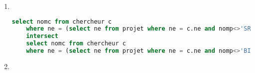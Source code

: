 \begin{enumerate}
{	L'utilisation des opérateurs ensembliste est indispensable, chercher ensuite une requete non ensembliste}
	\begin{lstlisting}[language=SQL, numbers=none]
select nomc from chercheur where nc in (
	select ne from aff 
	where np in(select np from projet where nomp = 'SRI')
)
intersect
select nomc from chercheur where nc in (
	select ne from aff 
	where np in(select np from projet where nomp = 'BIG')
)
	\end{lstlisting}
\item ~ 
\begin{lstlisting}[language=SQL, numbers=none]
	select nomc from chercheur c 
	where ne = (select ne from projet where ne = c.ne and nomp<>'SRI')
	intersect
	select nomc from chercheur c 
	where ne = (select ne from projet where ne = c.ne and nomp<>'BIG')
\end{lstlisting}
\item 
	\begin{lstlisting}[language=SQL, numbers=none]

	\end{lstlisting}
\end{enumerate}

